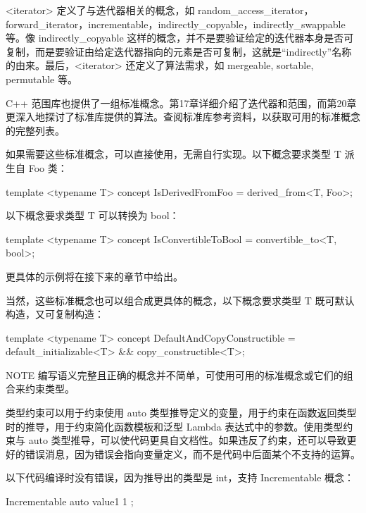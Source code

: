 <iterator> 定义了与迭代器相关的概念，如 random\_access\_iterator，forward\_iterator，incrementable，indirectly\_copyable，indirectly\_swappable等。像 indirectly\_copyable 这样的概念，并不是要验证给定的迭代器本身是否可复制，而是要验证由给定迭代器指向的元素是否可复制，这就是“indirectly”名称的由来。最后，<iterator> 还定义了算法需求，如 mergeable, sortable, permutable 等。

C++ 范围库也提供了一组标准概念。第17章详细介绍了迭代器和范围，而第20章更深入地探讨了标准库提供的算法。查阅标准库参考资料，以获取可用的标准概念的完整列表。

如果需要这些标准概念，可以直接使用，无需自行实现。以下概念要求类型 T 派生自 Foo 类：

\begin{cpp}
template <typename T>
concept IsDerivedFromFoo = derived_from<T, Foo>;
\end{cpp}

以下概念要求类型 T 可以转换为 bool：

\begin{cpp}
template <typename T>
concept IsConvertibleToBool = convertible_to<T, bool>;
\end{cpp}

更具体的示例将在接下来的章节中给出。

当然，这些标准概念也可以组合成更具体的概念，以下概念要求类型 T 既可默认构造，又可复制构造：

\begin{cpp}
template <typename T>
concept DefaultAndCopyConstructible =
    default_initializable<T> && copy_constructible<T>;
\end{cpp}

\begin{myNotic}{NOTE}
编写语义完整且正确的概念并不简单，可使用可用的标准概念或它们的组合来约束类型。
\end{myNotic}


类型约束可以用于约束使用 auto 类型推导定义的变量，用于约束在函数返回类型时的推导，用于约束简化函数模板和泛型 Lambda 表达式中的参数。使用类型约束与 auto 类型推导，可以使代码更具自文档性。如果违反了约束，还可以导致更好的错误消息，因为错误会指向变量定义，而不是代码中后面某个不支持的运算。

以下代码编译时没有错误，因为推导出的类型是 int，支持 Incrementable 概念：

\begin{cpp}
Incrementable auto value1 { 1 };
\end{cpp}


